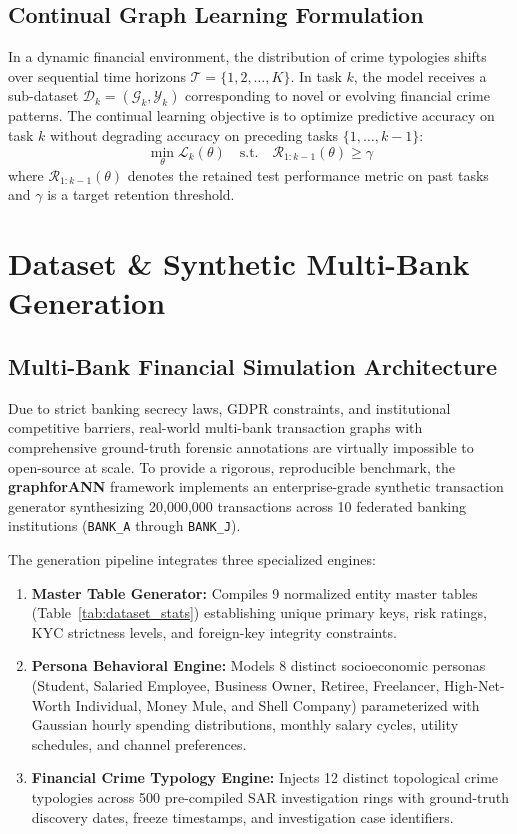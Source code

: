 \documentclass[conference]{IEEEtran}
\begin{document}
\subsection{Continual Graph Learning Formulation}
In a dynamic financial environment, the distribution of crime typologies shifts over sequential time horizons $\mathcal{T} = \{1, 2, \dots, K\}$. In task $k$, the model receives a sub-dataset $\mathcal{D}_k = (\mathcal{G}_k, \mathcal{Y}_k)$ corresponding to novel or evolving financial crime patterns. The continual learning objective is to optimize predictive accuracy on task $k$ without degrading accuracy on preceding tasks $\{1, \dots, k-1\}$:
\begin{equation}
    \min_\theta \mathcal{L}_k(\theta) \quad \text{s.t.} \quad \mathcal{R}_{1:k-1}(\theta) \ge \gamma
\end{equation}
where $\mathcal{R}_{1:k-1}(\theta)$ denotes the retained test performance metric on past tasks and $\gamma$ is a target retention threshold.

\section{Dataset \& Synthetic Multi-Bank Generation}
\label{sec:dataset}

\subsection{Multi-Bank Financial Simulation Architecture}
Due to strict banking secrecy laws, GDPR constraints, and institutional competitive barriers, real-world multi-bank transaction graphs with comprehensive ground-truth forensic annotations are virtually impossible to open-source at scale. To provide a rigorous, reproducible benchmark, the \textbf{graphforANN} framework implements an enterprise-grade synthetic transaction generator synthesizing 20,000,000 transactions across 10 federated banking institutions (\texttt{BANK\_A} through \texttt{BANK\_J}).

The generation pipeline integrates three specialized engines:
\begin{enumerate}
    \item \textbf{Master Table Generator:} Compiles 9 normalized entity master tables (Table~\ref{tab:dataset_stats}) establishing unique primary keys, risk ratings, KYC strictness levels, and foreign-key integrity constraints.
    \item \textbf{Persona Behavioral Engine:} Models 8 distinct socioeconomic personas (Student, Salaried Employee, Business Owner, Retiree, Freelancer, High-Net-Worth Individual, Money Mule, and Shell Company) parameterized with Gaussian hourly spending distributions, monthly salary cycles, utility schedules, and channel preferences.
    \item \textbf{Financial Crime Typology Engine:} Injects 12 distinct topological crime typologies across 500 pre-compiled SAR investigation rings with ground-truth discovery dates, freeze timestamps, and investigation case identifiers.
\end{enumerate}
\end{document}

